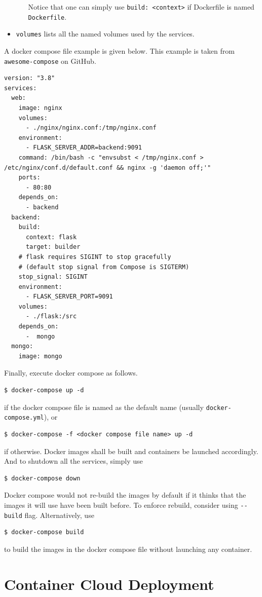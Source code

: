 \begin{itemize}
\begin{itemize}
		Notice that one can simply use \texttt{build: <context>} if Dockerfile is named \verb|Dockerfile|.
		
	\end{itemize}
	
	\item \verb|volumes| lists all the named volumes used by the services.
\end{itemize}

A docker compose file example is given below. This example is taken from \texttt{awesome-compose} on GitHub. 
\begin{lstlisting}
version: "3.8"
services:
  web:
    image: nginx
    volumes:
      - ./nginx/nginx.conf:/tmp/nginx.conf
    environment: 
      - FLASK_SERVER_ADDR=backend:9091  
    command: /bin/bash -c "envsubst < /tmp/nginx.conf > /etc/nginx/conf.d/default.conf && nginx -g 'daemon off;'" 
    ports:
      - 80:80
    depends_on:
      - backend
  backend:
    build:
      context: flask
      target: builder
    # flask requires SIGINT to stop gracefully
    # (default stop signal from Compose is SIGTERM)
    stop_signal: SIGINT
    environment:
      - FLASK_SERVER_PORT=9091
    volumes:
      - ./flask:/src
    depends_on:
      -  mongo  
  mongo:
    image: mongo
\end{lstlisting}

Finally, execute docker compose as follows.
\begin{lstlisting}
$ docker-compose up -d
\end{lstlisting}
if the docker compose file is named as the default name (usually \verb|docker-compose.yml|), or
\begin{lstlisting}
$ docker-compose -f <docker compose file name> up -d
\end{lstlisting}
if otherwise. Docker images shall be built and containers be launched accordingly. And to shutdown all the services, simply use
\begin{lstlisting}
$ docker-compose down
\end{lstlisting}

Docker compose would not re-build the images by default if it thinks that the images it will use have been built before. To enforce rebuild, consider using \verb|--build| flag. Alternatively, use 
\begin{lstlisting}
$ docker-compose build
\end{lstlisting}
to build the images in the docker compose file without launching any container.

\section{Container Cloud Deployment}

